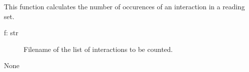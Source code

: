 \documentclass[a4paper,10pt,english]{sphinxmanual}
\begin{document}

\begin{fulllineitems}
\label{\detokenize{run_FLUTE:run_FLUTE.getDups}}
\sphinxAtStartPar
This function calculates the number of occurences of an interaction in a reading set.
\begin{description}
\item[{f: str}] \leavevmode
\sphinxAtStartPar
Filename of the list of interactions to be counted.

\end{description}

\sphinxAtStartPar
None

\end{fulllineitems}


\begin{fulllineitems}
\label{\detokenize{run_FLUTE:run_FLUTE.getArgs}}
\end{fulllineitems}

\end{document}
